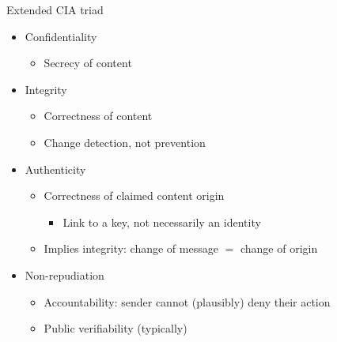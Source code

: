 \begin{frame}{Extended CIA triad}
  \begin{itemize}
    \pause
    \item Confidentiality
    \begin{itemize}
      \item Secrecy of content
    \end{itemize}
    \pause
    \item Integrity
    \begin{itemize}
      \item Correctness of content
      \item Change detection, not prevention
    \end{itemize}
    \pause
    \item Authenticity
    \begin{itemize}
      \item Correctness of claimed content origin
      \begin{itemize}
        \item Link to a key, not necessarily an identity
      \end{itemize}
      \item Implies integrity: change of message $=$ change of origin
    \end{itemize}
    \pause
    \item Non-repudiation
    \begin{itemize}
      \item Accountability: sender cannot (plausibly) deny their action
      \item Public verifiability (typically)
    \end{itemize}
  \end{itemize}
\end{frame}

